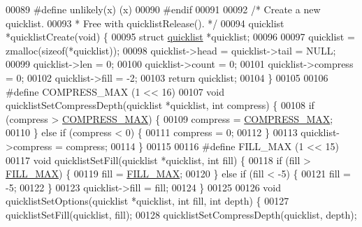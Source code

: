 \begin{DoxyCode}
{00089 \textcolor{preprocessor}{#}\textcolor{preprocessor}{define} \textcolor{preprocessor}{unlikely}\textcolor{preprocessor}{(}\textcolor{preprocessor}{x}\textcolor{preprocessor}{)} \textcolor{preprocessor}{(}\textcolor{preprocessor}{x}\textcolor{preprocessor}{)}
00090 \textcolor{preprocessor}{#}\textcolor{preprocessor}{endif}
00091 
00092 \textcolor{comment}{/* Create a new quicklist.}
00093 \textcolor{comment}{ * Free with quicklistRelease(). */}
00094 quicklist *quicklistCreate(\textcolor{keywordtype}{void}) \{
00095     \textcolor{keyword}{struct} \hyperlink{structquicklist}{quicklist} *quicklist;
00096 
00097     quicklist = zmalloc(\textcolor{keyword}{sizeof}(*quicklist));
00098     quicklist->head = quicklist->tail = NULL;
00099     quicklist->len = 0;
00100     quicklist->count = 0;
00101     quicklist->compress = 0;
00102     quicklist->fill = -2;
00103     \textcolor{keywordflow}{return} quicklist;
00104 \}
00105 
00106 \textcolor{preprocessor}{#}\textcolor{preprocessor}{define} \textcolor{preprocessor}{COMPRESS\_MAX} \textcolor{preprocessor}{(}1 \textcolor{preprocessor}{<<} 16\textcolor{preprocessor}{)}
00107 \textcolor{keywordtype}{void} quicklistSetCompressDepth(quicklist *quicklist, \textcolor{keywordtype}{int} compress) \{
00108     \textcolor{keywordflow}{if} (compress > \hyperlink{quicklist_8c_ad61a8b6ae21c3cf5c4a7d6e81b95b6d7}{COMPRESS\_MAX}) \{
00109         compress = \hyperlink{quicklist_8c_ad61a8b6ae21c3cf5c4a7d6e81b95b6d7}{COMPRESS\_MAX};
00110     \} \textcolor{keywordflow}{else} \textcolor{keywordflow}{if} (compress < 0) \{
00111         compress = 0;
00112     \}
00113     quicklist->compress = compress;
00114 \}
00115 
00116 \textcolor{preprocessor}{#}\textcolor{preprocessor}{define} \textcolor{preprocessor}{FILL\_MAX} \textcolor{preprocessor}{(}1 \textcolor{preprocessor}{<<} 15\textcolor{preprocessor}{)}
00117 \textcolor{keywordtype}{void} quicklistSetFill(quicklist *quicklist, \textcolor{keywordtype}{int} fill) \{
00118     \textcolor{keywordflow}{if} (fill > \hyperlink{quicklist_8c_a6872709e1a4dbf58b844c3fcd5c2f6ee}{FILL\_MAX}) \{
00119         fill = \hyperlink{quicklist_8c_a6872709e1a4dbf58b844c3fcd5c2f6ee}{FILL\_MAX};
00120     \} \textcolor{keywordflow}{else} \textcolor{keywordflow}{if} (fill < -5) \{
00121         fill = -5;
00122     \}
00123     quicklist->fill = fill;
00124 \}
00125 
00126 \textcolor{keywordtype}{void} quicklistSetOptions(quicklist *quicklist, \textcolor{keywordtype}{int} fill, \textcolor{keywordtype}{int} depth) \{
00127     quicklistSetFill(quicklist, fill);
00128     quicklistSetCompressDepth(quicklist, depth);
}
\end{DoxyCode}
